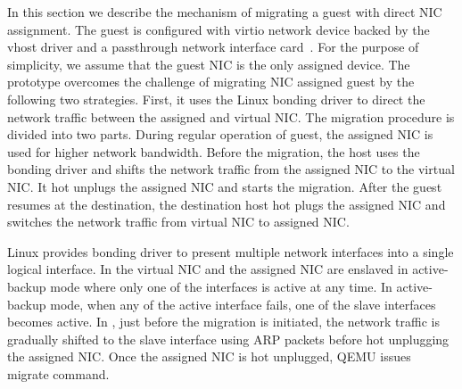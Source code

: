 In this section we describe the mechanism of migrating a guest with 
direct NIC assignment. The guest is configured with virtio network 
device backed by the vhost driver and a passthrough network interface 
card~\cite{zhai:2008}. For the purpose of simplicity, we assume that the 
guest NIC is the only assigned device. The prototype overcomes 
the challenge of migrating NIC assigned guest by the following
two strategies. First, it uses the Linux bonding driver to
direct the network traffic between the assigned and virtual
NIC. The migration procedure is divided into two parts. During regular operation 
of guest, the assigned NIC is used for higher network bandwidth. 
Before the migration, the host uses the bonding driver and shifts the
network traffic from the assigned NIC to the virtual NIC. It
hot unplugs the assigned NIC and starts the migration. After
the guest resumes at the destination, the destination host hot
plugs the assigned NIC and switches the network traffic
from virtual NIC to assigned NIC. 

%

Linux provides bonding driver to present multiple network interfaces
into a single logical interface. In \na the virtual NIC and the assigned NIC 
are enslaved in active-backup mode where only one of the interfaces
is active at any time. In active-backup mode, when any of the active
interface fails, one of the slave interfaces becomes active. In \na,
just before the migration is initiated, the network traffic is gradually 
shifted to the slave interface using ARP packets before hot unplugging
the assigned NIC. Once the assigned NIC is hot unplugged, QEMU issues migrate
command. 

